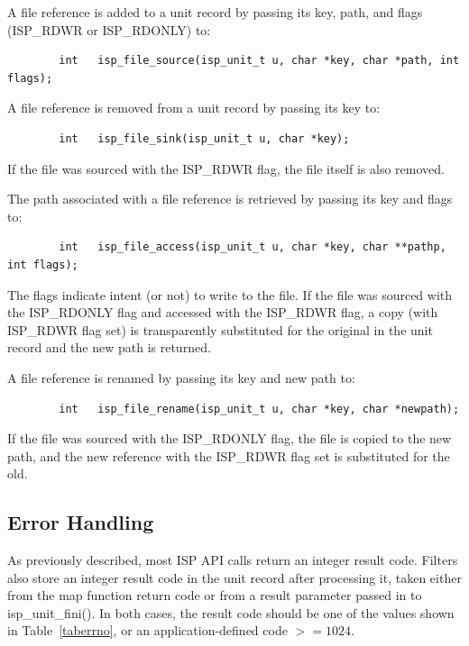 \documentclass{article}
\begin{document}
A file reference is added to a unit record by passing its key, path, and
flags (ISP\_RDWR or ISP\_RDONLY) to:
\begin{verbatim}
        int   isp_file_source(isp_unit_t u, char *key, char *path, int flags);
\end{verbatim}

A file reference is removed from a unit record by passing its key to:
\begin{verbatim}
        int   isp_file_sink(isp_unit_t u, char *key);
\end{verbatim}
If the file was sourced with the ISP\_RDWR flag, the file itself is also 
removed.  

The path associated with a file reference is retrieved by 
passing its key and flags to:
\begin{verbatim}
        int   isp_file_access(isp_unit_t u, char *key, char **pathp, int flags);
\end{verbatim}
The flags indicate intent (or not) to write to the file.
If the file was sourced with the ISP\_RDONLY flag and accessed with the
ISP\_RDWR flag, a copy (with ISP\_RDWR flag set) is transparently substituted 
for the original in the unit record and the new path is returned.

A file reference is renamed by passing its key and new path to:
\begin{verbatim}
        int   isp_file_rename(isp_unit_t u, char *key, char *newpath);
\end{verbatim}
If the file was sourced with the ISP\_RDONLY flag, the file is copied to the
new path, and the new reference with the ISP\_RDWR flag set is substituted 
for the old. 

\subsection{Error Handling}\label{secerrorhand}

As previously described, most ISP API calls return an integer result code.
Filters also store an integer result code in the unit record after
processing it, taken either from the map function return code or from
a result parameter passed in to isp\_unit\_fini().  
In both cases, the result code should be one of 
the values shown in Table~\ref{taberrno}, 
or an application-defined code $>= 1024$.
\end{document}
